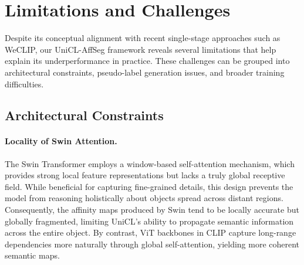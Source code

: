 





\section{Limitations and Challenges}
\label{sec:limitations_and_challenges}

Despite its conceptual alignment with recent single-stage approaches such as WeCLIP, our UniCL-AffSeg framework reveals several limitations that help explain its underperformance in practice. These challenges can be grouped into architectural constraints, pseudo-label generation issues, and broader training difficulties.

\subsection{Architectural Constraints}

\paragraph{Locality of Swin Attention.}
The Swin Transformer employs a window-based self-attention mechanism, which provides strong local feature representations but lacks a truly global receptive field. While beneficial for capturing fine-grained details, this design prevents the model from reasoning holistically about objects spread across distant regions. Consequently, the affinity maps produced by Swin tend to be locally accurate but globally fragmented, limiting UniCL's ability to propagate semantic information across the entire object. By contrast, ViT backbones in CLIP capture long-range dependencies more naturally through global self-attention, yielding more coherent semantic maps.

